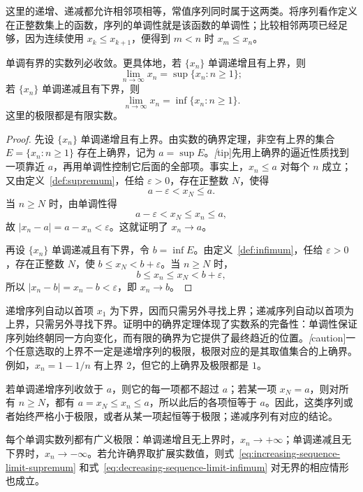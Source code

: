 这里的递增、递减都允许相邻项相等，常值序列同时属于这两类。将序列看作定义在正整数集上的函数，序列的单调性就是该函数的单调性；比较相邻两项已经足够，因为连续使用 $x_k\leq x_{k+1}$，便得到 $m<n$ 时 $x_m\leq x_n$。

\begin{theorem}[单调收敛原理]
\label{thm:monotone-convergence-principle}
单调有界的实数列必收敛。更具体地，若 $\{x_n\}$ 单调递增且有上界，则
\begin{equation}
    \lim_{n\to\infty}x_n=\sup\{x_n:n\geq1\};
    \label{eq:increasing-sequence-limit-supremum}
\end{equation}
若 $\{x_n\}$ 单调递减且有下界，则
\begin{equation}
    \lim_{n\to\infty}x_n=\inf\{x_n:n\geq1\}.
    \label{eq:decreasing-sequence-limit-infimum}
\end{equation}
这里的极限都是有限实数。
\end{theorem}

\begin{proof}
先设 $\{x_n\}$ 单调递增且有上界。由实数的确界定理，非空有上界的集合 $E=\{x_n:n\geq1\}$ 存在上确界，记为 $a=\sup E$。\emph[tip]{先用上确界的逼近性质找到一项靠近 $a$，再用单调性控制它后面的全部项。}事实上，$x_n\leq a$ 对每个 $n$ 成立；又由定义~\ref{def:supremum}，任给 $\varepsilon>0$，存在正整数 $N$，使得
\[
    a-\varepsilon<x_N\leq a.
\]
当 $n\geq N$ 时，由单调性得
\[
    a-\varepsilon<x_N\leq x_n\leq a,
\]
故 $|x_n-a|=a-x_n<\varepsilon$。这就证明了 $x_n\to a$。

再设 $\{x_n\}$ 单调递减且有下界，令 $b=\inf E$。由定义~\ref{def:infimum}，任给 $\varepsilon>0$，存在正整数 $N$，使 $b\leq x_N<b+\varepsilon$。当 $n\geq N$ 时，
\[
    b\leq x_n\leq x_N<b+\varepsilon,
\]
所以 $|x_n-b|=x_n-b<\varepsilon$，即 $x_n\to b$。
\end{proof}

递增序列自动以首项 $x_1$ 为下界，因而只需另外寻找上界；递减序列自动以首项为上界，只需另外寻找下界。证明中的确界定理体现了实数系的完备性：单调性保证序列始终朝同一方向变化，而有限的确界为它提供了最终趋近的位置。\emph[caution]{一个任意选取的上界不一定是递增序列的极限，极限对应的是其取值集合的上确界。}例如，$x_n=1-1/n$ 有上界 $2$，但它的上确界及极限都是 $1$。

若单调递增序列收敛于 $a$，则它的每一项都不超过 $a$；若某一项 $x_N=a$，则对所有 $n\geq N$，都有 $a=x_N\leq x_n\leq a$，所以此后的各项恒等于 $a$。因此，这类序列或者始终严格小于极限，或者从某一项起恒等于极限；递减序列有对应的结论。

\begin{corollary}
\label{cor:monotone-sequence-generalized-limit}
每个单调实数列都有广义极限：单调递增且无上界时，$x_n\to+\infty$；单调递减且无下界时，$x_n\to-\infty$。若允许确界取扩展实数值，则式~\eqref{eq:increasing-sequence-limit-supremum} 和式~\eqref{eq:decreasing-sequence-limit-infimum} 对无界的相应情形也成立。
\end{corollary}

